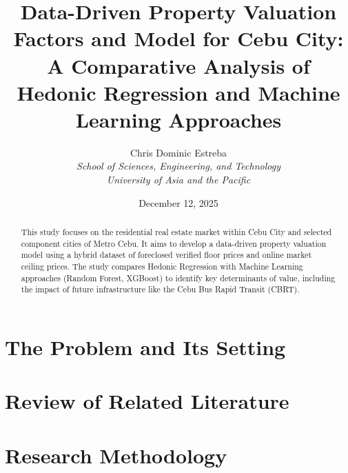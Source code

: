 \documentclass[12pt, a4paper]{report}
\title{\textbf{Data-Driven Property Valuation Factors and Model for Cebu City:}\\
\large{A Comparative Analysis of Hedonic Regression and Machine Learning Approaches}}
\author{Chris Dominic Estreba\\
\textit{School of Sciences, Engineering, and Technology}\\
\textit{University of Asia and the Pacific}}
\date{December 12, 2025}
\begin{document}
\maketitle

\begin{abstract}
This study focuses on the residential real estate market within Cebu City and selected component cities of Metro Cebu. It aims to develop a data-driven property valuation model using a hybrid dataset of foreclosed verified floor prices and online market ceiling prices. The study compares Hedonic Regression with Machine Learning approaches (Random Forest, XGBoost) to identify key determinants of value, including the impact of future infrastructure like the Cebu Bus Rapid Transit (CBRT).
\end{abstract}

\tableofcontents

\chapter{The Problem and Its Setting}


\chapter{Review of Related Literature}


\chapter{Research Methodology}


\end{document}
